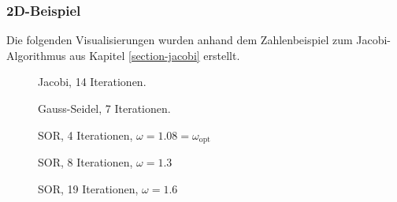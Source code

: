 \begin{refsection}
\subsubsection{2D-Beispiel}
Die folgenden Visualisierungen wurden anhand dem Zahlenbeispiel zum
Jacobi-Algorithmus aus Kapitel \ref{section-jacobi} erstellt.
\begin{figure}[!ht]\centering
\caption{Jacobi, 14 Iterationen.}
\label{fig:Jac. 2D Bsp}
\end{figure}
\begin{figure}[!ht]\centering
\caption{Gauss-Seidel, 7 Iterationen.}
\label{fig:G.-S. 2D Bsp}
\end{figure}
\begin{figure}[!ht]\centering
\caption{SOR, 4 Iterationen, $\omega=1.08=\omega_{\text{opt}}$}
\label{fig:SOR w=1.08= 2D Bsp}
\end{figure}

\begin{figure}[!ht]\centering
\caption{SOR, 8 Iterationen, $\omega=1.3$}
\label{fig:SOR w=1.3 2D Bsp}
\end{figure}
\begin{figure}[!ht]\centering
\caption{SOR, 19 Iterationen, $\omega=1.6$}
\label{fig:SOR w=1.6 2D Bsp}
\end{figure}
	

\end{refsection}
